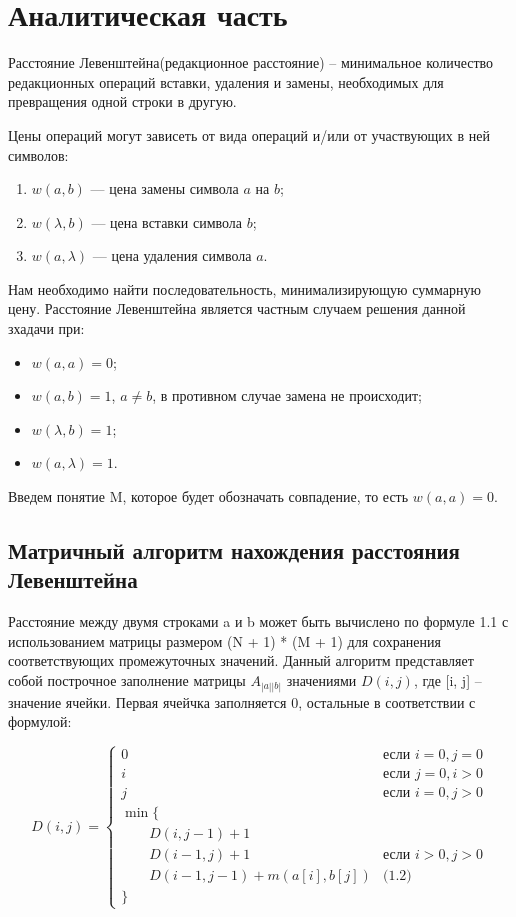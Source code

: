 \chapter{Аналитическая часть}

Расстояние Левенштейна(редакционное расстояние) -- минимальное количество редакционных операций вставки, 
удаления и замены, необходимых для превращения одной строки в другую.\cite{distances}

Цены операций могут зависеть от вида операций и/или от участвующих в ней символов:
\begin{enumerate}[label=\arabic*)]
	\item $w(a, b)$ --- цена замены символа $a$ на $b$;
	\item $w(\lambda, b)$ --- цена вставки символа $b$;
	\item $w(a, \lambda)$ --- цена удаления символа $a$.
\end{enumerate}

Нам необходимо найти последовательность, минимализирующую суммарную цену. Расстояние Левенштейна 
является частным случаем решения данной зхадачи при:
\begin{itemize}[label=---]
    \item $w(a, a) = 0$;
	\item $w(a, b) = 1$, $a \neq b$, в противном случае замена не происходит;
	\item $w(\lambda, b) = 1$;
	\item $w(a, \lambda) = 1$.
\end{itemize}

Введем понятие M, которое будет обозначать совпадение, то есть $w(a, a) = 0$.

\section{Матричный алгоритм нахождения расстояния Левенштейна}

Расстояние между двумя строками a и b может быть вычислено по формуле 1.1
с использованием матрицы размером (N + 1) * (M + 1) для сохранения соответствующих промежуточных значений. Данный
алгоритм представляет собой построчное заполнение матрицы $A_{|a||b|}$ значениями $D(i, j)$, где 
[i, j] -- значение ячейки. Первая ячейчка заполняется 0, остальные в соответствии с формулой:


\begin{equation}
    \label{eq:D}
    D(i, j) = \begin{cases}
        0 & \text{если } i = 0, j = 0\\
        i & \text{если } j = 0, i > 0\\
        j & \text{если } i = 0, j > 0\\
        \min \lbrace \\
        \qquad D(i, j-1) + 1\\
        \qquad D(i-1, j) + 1 & \text{если } i > 0, j > 0\\
        \qquad D(i-1, j-1) + m(a[i], b[j]) & \text{(1.2)}\\
        \rbrace
    \end{cases}
\end{equation}

